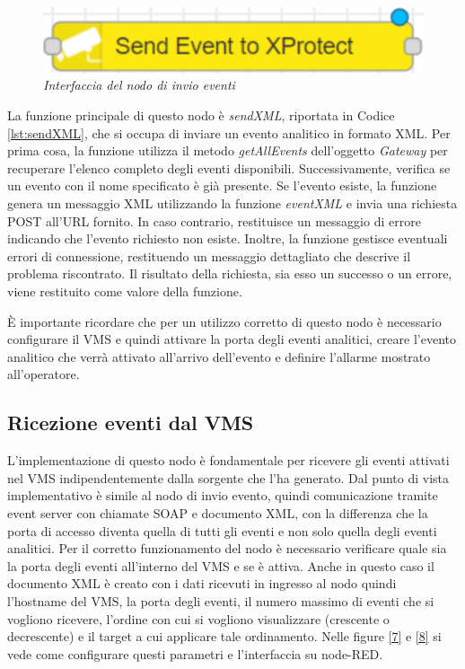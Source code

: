 \documentclass[a4paper, openright, thesis]{report}
\begin{document}
\begin{figure}[H]
    \centering
    \includegraphics[width=0.5\linewidth]{img/5.png}
    \caption{\textit{Interfaccia del nodo di invio eventi}}
    \label{6}
\end{figure}
\noindent
La funzione principale di questo nodo è \textit{sendXML}, riportata in Codice \ref{lst:sendXML}, che si occupa di inviare un evento analitico in formato XML. Per prima cosa, la funzione utilizza il metodo \textit{getAllEvents} dell'oggetto \textit{Gateway} per recuperare l'elenco completo degli eventi disponibili. Successivamente, verifica se un evento con il nome specificato è già presente. Se l'evento esiste, la funzione genera un messaggio XML utilizzando la funzione \textit{eventXML} e invia una richiesta POST all'URL fornito. In caso contrario, restituisce un messaggio di errore indicando che l'evento richiesto non esiste. Inoltre, la funzione gestisce eventuali errori di connessione, restituendo un messaggio dettagliato che descrive il problema riscontrato. Il risultato della richiesta, sia esso un successo o un errore, viene restituito come valore della funzione.

\begin{figure}[H]
    \centering
    
\end{figure} 
\noindent
È importante ricordare che per un utilizzo corretto di questo nodo è necessario configurare il VMS e quindi attivare la porta degli eventi analitici, creare l’evento analitico
che verrà attivato all’arrivo dell’evento e definire l’allarme mostrato all’operatore.

\subsection{Ricezione eventi dal VMS}\label{receivevent}
L’implementazione di questo nodo è fondamentale per ricevere gli eventi attivati nel VMS indipendentemente dalla sorgente che l’ha generato.
Dal punto di vista implementativo è simile al nodo di invio evento, quindi comunicazione tramite event server con chiamate SOAP e documento XML, con la differenza che la porta
di accesso diventa quella di tutti gli eventi e non solo quella degli eventi analitici.
Per il corretto funzionamento del nodo è necessario verificare quale sia la porta degli eventi all’interno del VMS e se è attiva. Anche in questo caso il documento XML è creato con i dati ricevuti in ingresso al nodo quindi l’hostname del VMS, la porta degli eventi, il numero massimo di eventi che si
vogliono ricevere, l’ordine con cui si vogliono visualizzare (crescente o decrescente) e il
target a cui applicare tale ordinamento. Nelle figure \ref{7} e \ref{8} si vede come configurare questi parametri e l'interfaccia su node-RED.
\end{document}
